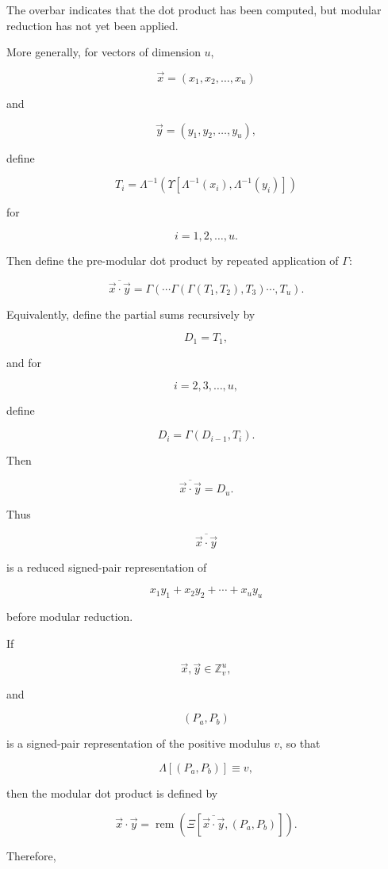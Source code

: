 \documentclass[12pt]{article}
\begin{document}
The overbar indicates that the dot product has been computed, but modular reduction has not yet been applied.

More generally, for vectors of dimension \(u\),

\[
\vec{x}
=
(x_1,x_2,\ldots,x_u)
\]

and

\[
\vec{y}
=
(y_1,y_2,\ldots,y_u),
\]

define

\[
T_i
=
\Lambda^{-1}
\left(
\Upsilon
\left[
\Lambda^{-1}(x_i),
\Lambda^{-1}(y_i)
\right]
\right)
\]

for

\[
i=1,2,\ldots,u.
\]

Then define the pre-modular dot product by repeated application of \(\Gamma\):

\[
\boxed{
\overline{\vec{x}\cdot\vec{y}}
=
\Gamma
\left(
\cdots
\Gamma
\left(
\Gamma(T_1,T_2),
T_3
\right)
\cdots,
T_u
\right).
}
\]

Equivalently, define the partial sums recursively by

\[
D_1=T_1,
\]

and for

\[
i=2,3,\ldots,u,
\]

define

\[
\boxed{
D_i
=
\Gamma(D_{i-1},T_i).
}
\]

Then

\[
\boxed{
\overline{\vec{x}\cdot\vec{y}}
=
D_u.
}
\]

Thus

\[
\overline{\vec{x}\cdot\vec{y}}
\]

is a reduced signed-pair representation of

\[
x_1y_1+x_2y_2+\cdots+x_uy_u
\]

before modular reduction.

If

\[
\vec{x},\vec{y}\in\mathbb Z_v^u,
\]

and

\[
(P_a,P_b)
\]

is a signed-pair representation of the positive modulus \(v\), so that

\[
\Lambda[(P_a,P_b)]\equiv v,
\]

then the modular dot product is defined by

\[
\boxed{
\vec{x}\cdot\vec{y}
=
\operatorname{rem}
\left(
\Xi
\left[
\overline{\vec{x}\cdot\vec{y}},
(P_a,P_b)
\right]
\right).
}
\]

Therefore,
\end{document}
